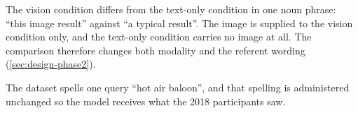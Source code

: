 The vision condition differs from the text-only condition in one noun phrase:
``this image result'' against ``a typical result''. The image is supplied to
the vision condition only, and the text-only condition carries no image at
all. The comparison therefore changes both modality and the referent
wording
(\cref{sec:design-phase2}).

The dataset spells one query ``hot air baloon'', and that spelling is
administered unchanged so the model receives what the 2018 participants saw.

